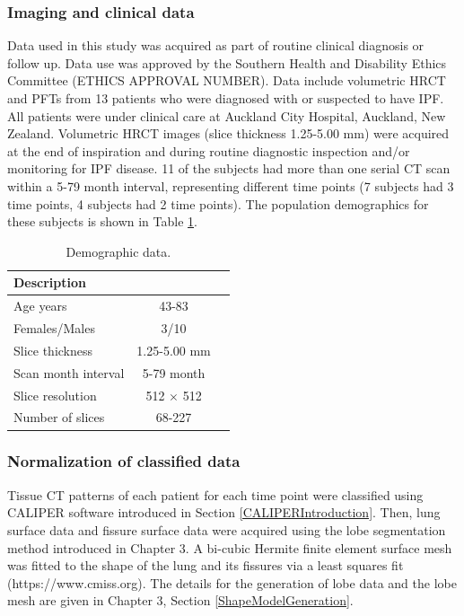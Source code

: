 \subsubsection{Imaging and clinical data}
Data used in this study was acquired as part of routine clinical diagnosis or follow up. Data use was approved by the Southern Health and Disability Ethics Committee (ETHICS APPROVAL NUMBER). Data include volumetric HRCT and PFTs from 13 patients who were diagnosed with or suspected to have IPF. All patients were under clinical care at Auckland City Hospital, Auckland, New Zealand. Volumetric HRCT images (slice thickness 1.25-5.00 mm) were acquired at the end of inspiration and during routine diagnostic inspection and/or monitoring for IPF disease. 11 of the subjects had more than one serial CT scan within a 5-79 month interval, representing different time points (7 subjects had 3 time points, 4 subjects had 2 time points). The population demographics for these subjects is shown in Table \ref{tab:DemographicData}.

\begin{table}[h]
\centering
\caption{Demographic data.}
\label{tab:DemographicData}
\begin{tabular}{| l  | c | c|}
\hline
{\bf Description}  \\ \hline
Age years & 43-83 \\
\hline
Females/Males	& 3/10 \\
\hline
Slice thickness	& 1.25-5.00 mm \\
\hline
Scan month interval	& 5-79 month \\
\hline
Slice resolution	& 512 $\times$ 512 \\
\hline
Number of slices	& 68-227
\\ \hline
\end{tabular}
\end{table}

\subsubsection{Normalization of classified data} \label{DataNormalization}
Tissue CT patterns of each patient for each time point were classified using CALIPER software introduced in Section \ref{CALIPERIntroduction}. Then, lung surface data and fissure surface data were acquired using the lobe segmentation method introduced in Chapter 3. A bi-cubic Hermite finite element surface mesh was fitted to the shape of the lung and its fissures via a least squares fit (https://www.cmiss.org). The details for the generation of lobe data and the lobe mesh are given in Chapter 3, Section \ref{ShapeModelGeneration}.

